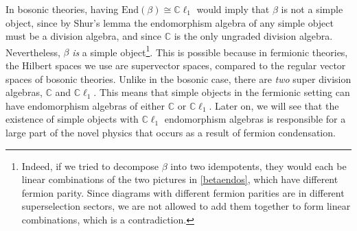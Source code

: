 \documentclass[12pt,a4paper]{article}
\newcommand{\cc}{\mathbb{C}}
\newcommand{\zt}{\mathbb{Z}_2}
\newcommand{\End}{\text{End}}
\newcommand{\cl}{\mathbb{C}\ell}
\begin{document}
In bosonic theories, having $\End(\beta)\cong\cl_1$ would imply that $\beta$ is not a simple object, 
since by Shur's lemma the endomorphism algebra of any simple object must be a division algebra, and
since $\cc$ is the only ungraded division algebra.
Nevertheless, $\beta$ {\it is} a simple object\footnote{Indeed, if we tried to decompose $\beta$ 
into two idempotents, they would each be linear combinations of the two pictures in \eqref{betaendos}, 
which have different fermion parity.
Since diagrams with different fermion parities are in different superselection sectors, 
we are not allowed to add them together to form linear combinations, which is a contradiction.}.
This is possible because in fermionic theories, the Hilbert spaces we use are supervector spaces, 
compared to the regular vector spaces of bosonic theories. 
Unlike in the bosonic case, there are {\it two} super division algebras, $\cc$ and $\cl_1$.
This means that simple objects in the fermionic setting can have endomorphism algebras of either $\cc$ or $\cl_1$.  
Later on, we will see that the existence of simple objects with $\cl_1$ endomorphism 
algebras is responsible for a large part of the novel physics that occurs as a result of fermion condensation. 
\end{document}
